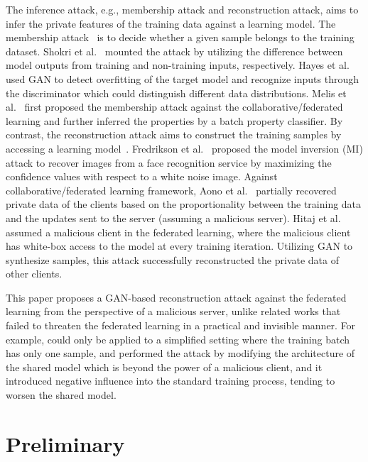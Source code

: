 \documentclass[10pt, conference, letterpaper]{IEEEtran}
\begin{document}
The inference attack, e.g., membership attack and reconstruction attack, aims to infer the private features of the training data against a learning model. The membership attack~\cite{shokri2017membership,hayes2017logan,melis2018inference} is to decide whether a given sample belongs to the training dataset.
Shokri et al.~\cite{shokri2017membership} mounted the attack by utilizing the difference between model outputs from training and non-training inputs, respectively.
Hayes et al.~\cite{hayes2017logan} used GAN to detect overfitting of the target model and recognize inputs through the discriminator which could distinguish different data distributions.
Melis et al.~\cite{melis2018inference} first proposed the membership attack against the collaborative/federated learning and further inferred the properties by a batch property classifier.
By contrast, the reconstruction attack aims to construct the training samples by accessing a learning model~\cite{fredrikson2015model,hitaj2017deep,aono2017privacy}.
Fredrikson et al.~\cite{fredrikson2015model} proposed the model inversion (MI) attack to recover images from a face recognition service by maximizing the confidence values with respect to a white noise image.
Against collaborative/federated learning framework, Aono et al.~\cite{aono2017privacy} partially recovered private data of the clients based on the proportionality between the training data and the updates sent to the server (assuming a malicious server).
Hitaj et al.~\cite{hitaj2017deep} assumed a malicious client in the federated learning, where the malicious client has white-box access to the model at every training iteration. Utilizing GAN to synthesize samples, this attack successfully reconstructed the private data of other clients.

This paper proposes a GAN-based reconstruction attack against the federated learning from the perspective of a malicious server, unlike related works that failed to threaten the federated learning in a practical and invisible manner. For example, \cite{aono2017privacy} could only be applied to a simplified setting where the training batch has only one sample,
and \cite{hitaj2017deep} performed the attack by modifying the architecture of the shared model which is beyond the power of a malicious client, and it introduced negative influence into the standard training process, tending to worsen the shared model.


\section{Preliminary} \label{sec:preliminary}
\end{document}
